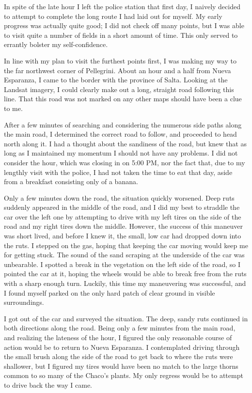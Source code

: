 {In spite of the late hour I left the police station that first day, I naively decided to attempt to complete the long route I had laid out for myself. My early progress was actually quite good; I did not check off many points, but I was able to visit quite a number of fields in a short amount of time. This only served to errantly bolster my self-confidence.

In line with my plan to visit the furthest points first, I was making my way to the far northwest corner of Pellegrini. About an hour and a half from Nueva Esparanza, I came to the border with the province of Salta. Looking at the Landsat imagery, I could clearly make out a long, straight road following this line. That this road was not marked on any other maps should have been a clue to me.

After a few minutes of searching and considering the numerous side paths along the main road, I determined the correct road to follow, and proceeded to head north along it. I had a thought about the sandiness of the road, but knew that as long as I maintained my momentum I should not have any problems. I did not consider the hour, which was closing in on 5:00 PM, nor the fact that, due to my lengthly visit with the police, I had not taken the time to eat that day, aside from a breakfast consisting only of a banana.

Only a few minutes down the road, the situation quickly worsened. Deep ruts suddenly appeared in the middle of the road, and I did my best to straddle the car over the left one by attempting to drive with my left tires on the side of the road and my right tires down the middle. However, the success of this maneuver was short lived, and before I knew it, the small, low car had dropped down into the ruts. I stepped on the gas, hoping that keeping the car moving would keep me for getting stuck. The sound of the sand scraping at the underside of the car was unbearable. I spotted a break in the vegetation on the left side of the road, so I pointed the car at it, hoping the wheels would be able to break free from the ruts with a sharp enough turn. Luckily, this time my maneuvering was successful, and I found myself parked on the only hard patch of clear ground in visible surroundings.

I got out of the car and surveyed the situation. The deep, sandy ruts continued in both directions along the road. Being only a few minutes from the main road, and realizing the lateness of the hour, I figured the only reasonable course of action would be to return to Nueva Esparanza. I contemplated driving through the small brush along the side of the road to get back to where the ruts were shallower, but I figured my tires would have been no match to the large thorns common to so many of the Chaco’s plants. My only regress would be to attempt to drive back the way I came.

}

